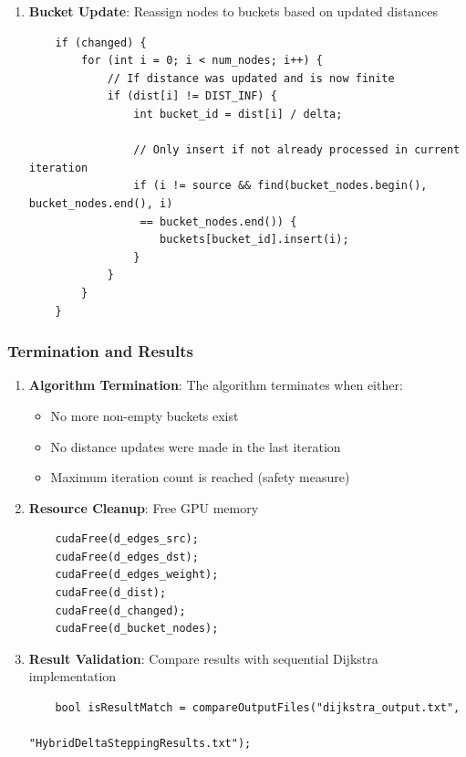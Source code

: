 \documentclass{article}
\begin{document}
\begin{enumerate}
    \item \textbf{Bucket Update}: Reassign nodes to buckets based on updated distances
    \begin{verbatim}
    if (changed) {
        for (int i = 0; i < num_nodes; i++) {
            // If distance was updated and is now finite
            if (dist[i] != DIST_INF) {
                int bucket_id = dist[i] / delta;
                
                // Only insert if not already processed in current iteration
                if (i != source && find(bucket_nodes.begin(), bucket_nodes.end(), i)
                 == bucket_nodes.end()) {
                    buckets[bucket_id].insert(i);
                }
            }
        }
    }
    \end{verbatim}
\end{enumerate}

\subsubsection*{Termination and Results}
\begin{enumerate}
    \item \textbf{Algorithm Termination}: The algorithm terminates when either:
    \begin{itemize}
        \item No more non-empty buckets exist
        \item No distance updates were made in the last iteration
        \item Maximum iteration count is reached (safety measure)
    \end{itemize}
    
    \item \textbf{Resource Cleanup}: Free GPU memory
    \begin{verbatim}
    cudaFree(d_edges_src);
    cudaFree(d_edges_dst);
    cudaFree(d_edges_weight);
    cudaFree(d_dist);
    cudaFree(d_changed);
    cudaFree(d_bucket_nodes);
    \end{verbatim}
    
    \item \textbf{Result Validation}: Compare results with sequential Dijkstra implementation
    \begin{verbatim}
    bool isResultMatch = compareOutputFiles("dijkstra_output.txt", 
                                           "HybridDeltaSteppingResults.txt");
    \end{verbatim}
\end{enumerate}
\end{document}
